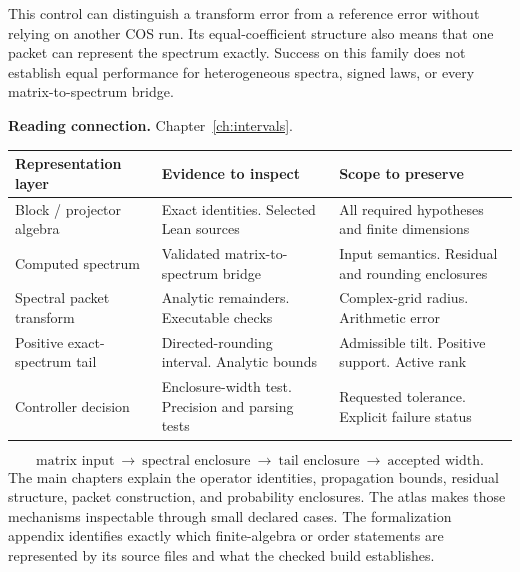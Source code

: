 This control can distinguish a transform error from a reference error without relying on another COS run. Its equal-coefficient structure also means that one packet can represent the spectrum exactly. Success on this family does not establish equal performance for heterogeneous spectra, signed laws, or every matrix-to-spectrum bridge.

\vfill{\footnotesize\color{navy}\textbf{Reading connection.} Chapter~\ref{ch:intervals}.}
\clearpage
{}
\vspace{3pt}
\vspace{5pt}\begin{center}\small\renewcommand{\arraystretch}{1.3}\begin{tabular}{@{}>{\raggedright\arraybackslash}P{.25\linewidth}>{\raggedright\arraybackslash}P{.33\linewidth}>{\raggedright\arraybackslash}P{.36\linewidth}@{}}\toprule
Representation layer & Evidence to inspect & Scope to preserve\\
\midrule
Block / projector algebra & Exact identities. Selected Lean sources & All required hypotheses and finite dimensions\\
Computed spectrum & Validated matrix-to-spectrum bridge & Input semantics. Residual and rounding enclosures\\
Spectral packet transform & Analytic remainders. Executable checks & Complex-grid radius. Arithmetic error\\
Positive exact-spectrum tail & Directed-rounding interval. Analytic bounds & Admissible tilt. Positive support. Active rank\\
Controller decision & Enclosure-width test. Precision and parsing tests & Requested tolerance. Explicit failure status\\
\bottomrule\end{tabular}\end{center}
\[\text{matrix input}\ \longrightarrow\ \text{spectral enclosure}\ \longrightarrow\ \text{tail enclosure}\ \longrightarrow\ \text{accepted width}.\]
The main chapters explain the operator identities, propagation bounds, residual structure, packet construction, and probability enclosures. The atlas makes those mechanisms inspectable through small declared cases. The formalization appendix identifies exactly which finite-algebra or order statements are represented by its source files and what the checked build establishes.

